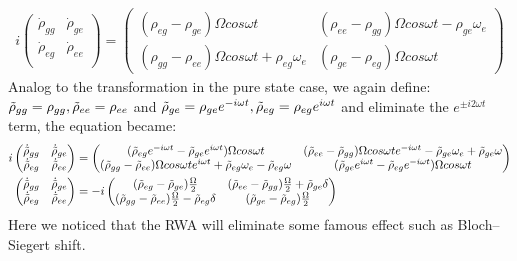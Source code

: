 \documentclass[11pt]{article}
\begin{document}
\begin{align*}
     i \begin{pmatrix}
    \Dot{\rho}_{gg} & \Dot{\rho}_{ge} \\
    \Dot{\rho}_{eg} & \Dot{\rho}_{ee} \\
\end{pmatrix} =  \begin{pmatrix}
    (\rho_{eg} - \rho_{ge}) \Omega cos \omega t & (\rho_{ee} - \rho_{gg}) \Omega cos \omega t - \rho_{ge} \omega_e \\
    (\rho_{gg} - \rho_{ee}) \Omega cos \omega t + \rho_{eg} \omega_e &  (\rho_{ge} - \rho_{eg}) \Omega cos \omega t 
\end{pmatrix}
\end{align*}
Analog to the transformation in the pure state case, we again define: $\Tilde{\rho}_{gg} = \rho_{gg}, \Tilde{\rho}_{ee} = \rho_{ee}$ and $\Tilde{\rho}_{ge} = \rho_{ge} e^{-i\omega t}, \Tilde{\rho}_{eg} = \rho_{eg} e^{i\omega t}$ and eliminate the $e^{\pm i2\omega t}$ term, the equation became:
\begin{align*}
     i \begin{pmatrix}
    \Dot{\Tilde{\rho}}_{gg} & \Dot{\Tilde{\rho}}_{ge} \\
    \Dot{\Tilde{\rho}}_{eg} & \Dot{\Tilde{\rho}}_{ee} \\
\end{pmatrix} &=
\begin{pmatrix}
    (\Tilde{\rho}_{eg}e^{-i\omega t} - \Tilde{\rho}_{ge}e^{i\omega t}) \Omega cos \omega t & (\Tilde{\rho}_{ee} - \Tilde{\rho}_{gg}) \Omega cos \omega t e^{-i\omega t} - \Tilde{\rho}_{ge} \omega_e +\Tilde{\rho}_{ge} \omega \\
    (\Tilde{\rho}_{gg} - \Tilde{\rho}_{ee}) \Omega cos \omega t e^{i\omega t} + \Tilde{\rho}_{eg} \omega_e - \Tilde{\rho}_{eg} \omega &  (\Tilde{\rho}_{ge}e^{i\omega t} - \Tilde{\rho}_{eg}e^{-i\omega t}) \Omega cos \omega t 
\end{pmatrix}\\
  \begin{pmatrix}
    \Dot{\Tilde{\rho}}_{gg} & \Dot{\Tilde{\rho}}_{ge} \\
    \Dot{\Tilde{\rho}}_{eg} & \Dot{\Tilde{\rho}}_{ee} \\
\end{pmatrix} &=
-i \begin{pmatrix}
    (\Tilde{\rho}_{eg} - \Tilde{\rho}_{ge}) \frac{\Omega}{2}  & (\Tilde{\rho}_{ee} - \Tilde{\rho}_{gg}) \frac{\Omega}{2} + \Tilde{\rho}_{ge} \delta \\
    (\Tilde{\rho}_{gg} - \Tilde{\rho}_{ee}) \frac{\Omega}{2}  - \Tilde{\rho}_{eg} \delta &  (\Tilde{\rho}_{ge} - \Tilde{\rho}_{eg}) \frac{\Omega}{2} 
\end{pmatrix}
\end{align*}
Here we noticed that the RWA will eliminate some famous effect such as Bloch–Siegert shift. 
\end{document}

